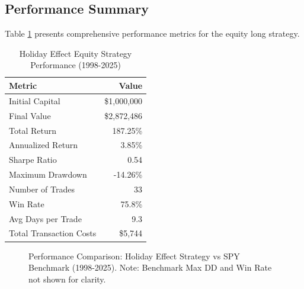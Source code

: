\documentclass[twocolumn,ieee]{arithmaxresearch}
\begin{document}
\subsection{Performance Summary}

Table \ref{tab:performance} presents comprehensive performance metrics for the equity long strategy.

\begin{table}[h]
\centering
\caption{Holiday Effect Equity Strategy Performance (1998-2025)}
\label{tab:performance}
\begin{tabular}{lr}
\toprule
\textbf{Metric} & \textbf{Value} \\
\midrule
Initial Capital & \$1,000,000 \\
Final Value & \$2,872,486 \\
Total Return & 187.25\% \\
Annualized Return & 3.85\% \\
Sharpe Ratio & 0.54 \\
Maximum Drawdown & -14.26\% \\
Number of Trades & 33 \\
Win Rate & 75.8\% \\
Avg Days per Trade & 9.3 \\
Total Transaction Costs & \$5,744 \\
\bottomrule
\end{tabular}
\end{table}

\begin{figure}[!t]
\centering
{}
\caption{Performance Comparison: Holiday Effect Strategy vs SPY Benchmark (1998-2025). Note: Benchmark Max DD and Win Rate not shown for clarity.}
\label{fig:performance}
\end{figure}
\end{document}
